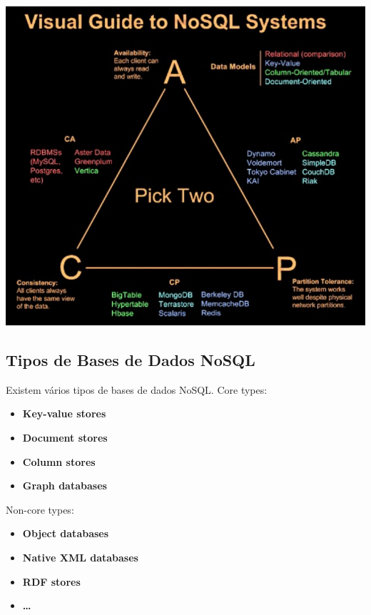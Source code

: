 \documentclass{article}
\begin{document}
\begin{center}
  \includegraphics[scale=0.3]{8}
\end{center}

\pagebreak

\subsection{Tipos de Bases de Dados NoSQL}

\begin{flushleft}
  Existem vários tipos de bases de dados NoSQL. Core types:
  \begin{itemize}
    \item \textbf{Key-value stores}
    \item \textbf{Document stores}
    \item \textbf{Column stores}
    \item \textbf{Graph databases}
  \end{itemize}

  Non-core types:
  \begin{itemize}
    \item \textbf{Object databases}
    \item \textbf{Native XML databases}
    \item \textbf{RDF stores}
    \item \textbf{\dots}
  \end{itemize}
\end{flushleft}
\end{document}
